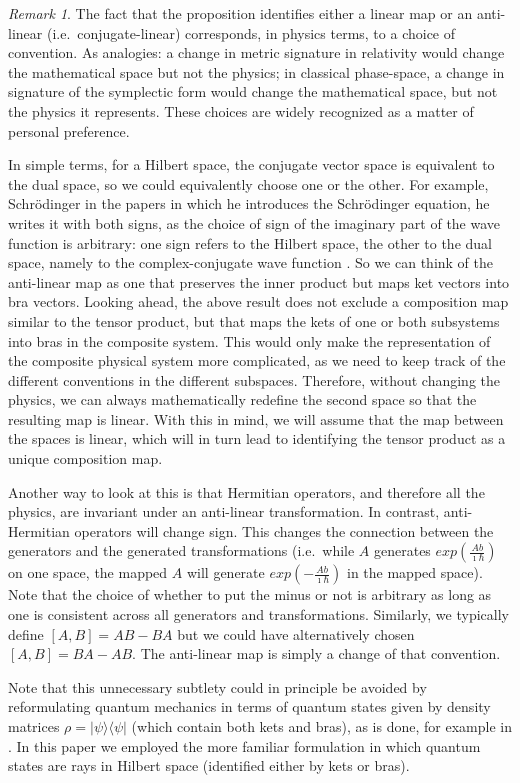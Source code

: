 \documentclass[aps,prl,amsmath,amssymb,twocolumn,nofootinbib]{revtex4}
\theoremstyle{plain}
\theoremstyle{definition}
\theoremstyle{remark}
\newtheorem*{remark}{Remark}
\def\>{\rangle}
\def\<{\langle}
\begin{document}
	\begin{remark}
		The fact that the proposition identifies either a linear map or an anti-linear (i.e.~conjugate-linear) corresponds, in physics terms, to a choice of convention. As analogies: a change in metric signature in relativity would change the mathematical space but not the physics; in classical phase-space, a change in signature of the symplectic form would change the mathematical space, but not the physics it represents. These choices are widely recognized as a matter of personal preference.
		
		In simple terms, for a Hilbert space, the conjugate
		vector space is equivalent to the dual space, so we
		could equivalently choose one or the other. For
		example, Schr\"odinger in the papers in which he
		introduces the Schr\"odinger equation, he writes it
		with both signs, as the choice of sign of the imaginary part of the wave function is arbitrary: one sign refers to
		the Hilbert space, the other to the dual space, namely
		to the complex-conjugate wave function \cite{sch}. So we can think of the anti-linear map as one that preserves the inner product but maps ket vectors into bra vectors. Looking ahead, the above result does not exclude a composition map similar to the tensor product, but that maps the kets of one or both subsystems into bras in the composite system. This would only make the representation of the composite physical system more complicated, as we need to keep track of the different conventions in the different subspaces. Therefore, without changing the physics, we can always mathematically redefine the second space so that the resulting map is linear. With this in mind, we will assume that the map between the spaces is linear, which will in turn lead to identifying the tensor product as a unique composition map.
		
		Another way to look at this is that Hermitian operators, and therefore all 
		the physics, are invariant under an anti-linear transformation.
		In contrast, anti-Hermitian operators will change sign. This 
		changes the connection between the generators and the generated 
		transformations (i.e.~while $A$ generates $exp(\frac{Ab}{\imath\hbar})$ 
		on one space, the mapped $A$ will generate 
		$exp(-\frac{Ab}{\imath\hbar})$ in the mapped space). Note that the 
		choice of whether to put the minus or not is arbitrary as long as one is consistent across all generators and transformations.
		Similarly, we typically define $[A, B] = AB - BA$ but we could have 
		alternatively chosen $[A, B] = BA - AB$. The anti-linear map is simply 
		a change of that convention.
		
		Note that this unnecessary subtlety could in principle be avoided by
		reformulating quantum mechanics in terms of quantum states given by
		density matrices $\rho=|\psi\>\<\psi|$ (which contain both  kets and
		bras), as is done, for example in \cite{ozawa,holevo}. In this paper
		we employed the more familiar formulation in which quantum states are
		rays in Hilbert space (identified either by kets or bras).
	\end{remark}
	
\end{document}
